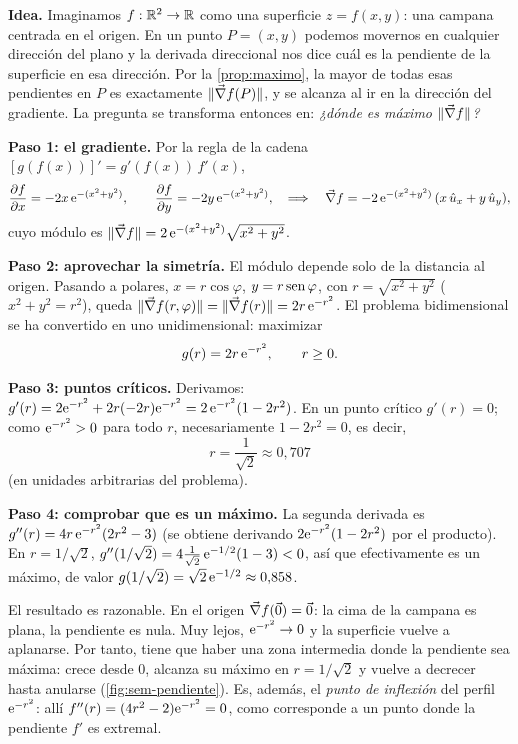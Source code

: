 \begin{resolucion}
\textbf{Idea.} Imaginamos $f:\mathbb{R}^{2}\to\mathbb{R}$ como una superficie $z=f(x,y)$: una
campana centrada en el origen. En un punto $P=(x,y)$ podemos movernos en
cualquier dirección del plano y la derivada direccional nos dice cuál es la
pendiente de la superficie en esa dirección. Por la \cref{prop:maximo}, la
mayor de todas esas pendientes en $P$ es exactamente $\lVert \vec{\nabla} f(P)\rVert$, y se
alcanza al ir en la dirección del gradiente. La pregunta se transforma
entonces en: \emph{¿dónde es máximo $\lVert \vec{\nabla} f\rVert$?}

\textbf{Paso 1: el gradiente.} Por la regla de la cadena
$[g(f(x))]'=g'(f(x))\,f'(x)$,
\[
  \frac{\partial f}{\partial x}=-2x\,\mathrm{e}^{-(x^{2}+y^{2})},\qquad
  \frac{\partial f}{\partial y}=-2y\,\mathrm{e}^{-(x^{2}+y^{2})},
  \quad\Longrightarrow\quad
  \vec{\nabla} f=-2\,\mathrm{e}^{-(x^{2}+y^{2})}\,(x\,\hat{u}_{x}+y\,\hat{u}_{y}),
\]
cuyo módulo es $\lVert \vec{\nabla} f\rVert=2\,\mathrm{e}^{-(x^{2}+y^{2})}\sqrt{x^{2}+y^{2}}$.

\textbf{Paso 2: aprovechar la simetría.} El módulo depende solo de la distancia
al origen. Pasando a polares, $x=r\cos\varphi$, $y=r\operatorname{sen}\varphi$, con
$r=\sqrt{x^{2}+y^{2}}$ ($x^{2}+y^{2}=r^{2}$), queda
$\lVert \vec{\nabla} f(r,\varphi)\rVert=\lVert \vec{\nabla} f(r)\rVert=2r\,\mathrm{e}^{-r^{2}}$. El problema
bidimensional se ha convertido en uno unidimensional: maximizar
\[
  g(r)=2r\,\mathrm{e}^{-r^{2}},\qquad r\ge0 .
\]

\textbf{Paso 3: puntos críticos.} Derivamos:
$g'(r)=2\mathrm{e}^{-r^{2}}+2r(-2r)\mathrm{e}^{-r^{2}}=2\,\mathrm{e}^{-r^{2}}(1-2r^{2})$. En un punto
crítico $g'(r)=0$; como $\mathrm{e}^{-r^{2}}>0$ para todo $r$, necesariamente
$1-2r^{2}=0$, es decir,
\[
  \boxed{\,r=\frac{1}{\sqrt{2}}\approx0{,}707\,}
\]
(en unidades arbitrarias del problema).

\textbf{Paso 4: comprobar que es un máximo.} La segunda derivada es
$g''(r)=4r\,\mathrm{e}^{-r^{2}}(2r^{2}-3)$ (se obtiene derivando
$2\mathrm{e}^{-r^{2}}(1-2r^{2})$ por el producto). En $r=1/\sqrt{2}$,
$g''(1/\sqrt{2})=4\tfrac{1}{\sqrt{2}}\,\mathrm{e}^{-1/2}(1-3)<0$, así que efectivamente
es un máximo, de valor $g(1/\sqrt{2})=\sqrt{2}\,\mathrm{e}^{-1/2}\approx0{,}858$.
\end{resolucion}

\begin{observacion}[Interpretación]
El resultado es razonable. En el origen $\vec{\nabla} f(\vec{0})=\vec{0}$: la cima de la
campana es plana, la pendiente es nula. Muy lejos, $\mathrm{e}^{-r^{2}}\to0$ y la
superficie vuelve a aplanarse. Por tanto, tiene que haber una zona intermedia
donde la pendiente sea máxima: crece desde $0$, alcanza su máximo en
$r=1/\sqrt{2}$ y vuelve a decrecer hasta anularse (\cref{fig:sem-pendiente}).
Es, además, el \emph{punto de inflexión} del perfil $\mathrm{e}^{-r^{2}}$: allí
$f''(r)=(4r^{2}-2)\mathrm{e}^{-r^{2}}=0$, como corresponde a un punto donde la
pendiente $f'$ es extremal.
\end{observacion}

